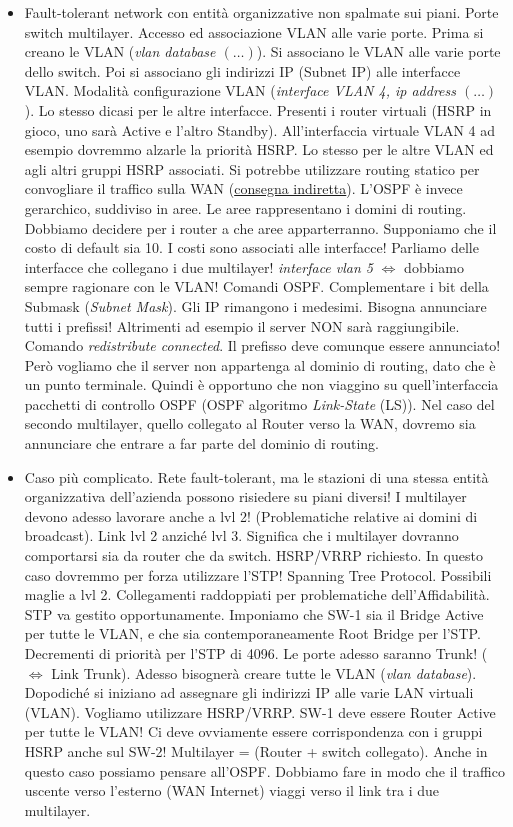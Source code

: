 \begin{itemize}

\item Fault-tolerant network con entità organizzative non spalmate sui piani. Porte switch multilayer. Accesso ed associazione VLAN alle varie porte. Prima si creano le VLAN (\textit{vlan database $(\dots)$}). Si associano le VLAN alle varie porte dello switch. Poi si associano gli indirizzi IP (Subnet IP) alle interfacce VLAN. Modalità configurazione VLAN (\textit{interface VLAN 4, ip address $(\dots)$}). Lo stesso dicasi per le altre interfacce. Presenti i router virtuali (HSRP in gioco, uno sarà Active e l'altro Standby). All'interfaccia virtuale VLAN 4 ad esempio dovremmo alzarle la priorità HSRP. Lo stesso per le altre VLAN ed agli altri gruppi HSRP associati. Si potrebbe utilizzare routing statico per convogliare il traffico sulla WAN (\underline{consegna indiretta}). L'OSPF è invece gerarchico, suddiviso in aree. Le aree rappresentano i domini di routing. Dobbiamo decidere per i router a che aree apparterranno. Supponiamo che il costo di default sia 10. I costi sono associati alle interfacce! Parliamo delle interfacce che collegano i due multilayer! \textit{interface vlan 5} $\iff$ dobbiamo sempre ragionare con le VLAN! Comandi OSPF. Complementare i bit della Submask (\textit{Subnet Mask}). Gli IP rimangono i medesimi. Bisogna annunciare tutti i prefissi! Altrimenti ad esempio il server NON sarà raggiungibile. Comando \textit{redistribute connected}. Il prefisso deve comunque essere annunciato! Però vogliamo che il server non appartenga al dominio di routing, dato che è un punto terminale. Quindi è opportuno che non viaggino su quell'interfaccia pacchetti di controllo OSPF (OSPF algoritmo \textit{Link-State} (LS)). Nel caso del secondo multilayer, quello collegato al Router verso la WAN, dovremo sia annunciare che entrare a far parte del dominio di routing.

\item Caso più complicato. Rete fault-tolerant, ma le stazioni di una stessa entità organizzativa dell'azienda possono risiedere su piani diversi! I multilayer devono adesso lavorare anche a lvl 2! (Problematiche relative ai domini di broadcast). Link lvl 2 anziché lvl 3. Significa che i multilayer dovranno comportarsi sia da router che da switch. HSRP/VRRP richiesto. In questo caso dovremmo per forza utilizzare l'STP! Spanning Tree Protocol. Possibili maglie a lvl 2. Collegamenti raddoppiati per problematiche dell'Affidabilità. STP va gestito opportunamente. Imponiamo che SW-1 sia il Bridge Active per tutte le VLAN, e che sia contemporaneamente Root Bridge per l'STP. Decrementi di priorità per l'STP di 4096. Le porte adesso saranno Trunk! ($\iff$ Link Trunk). Adesso bisognerà creare tutte le VLAN (\textit{vlan database}). Dopodiché si iniziano ad assegnare gli indirizzi IP alle varie LAN virtuali (VLAN). Vogliamo utilizzare HSRP/VRRP. SW-1 deve essere Router Active per tutte le VLAN! Ci deve ovviamente essere corrispondenza con i gruppi HSRP anche sul SW-2! Multilayer = (Router + switch collegato). Anche in questo caso possiamo pensare all'OSPF. Dobbiamo fare in modo che il traffico uscente verso l'esterno (WAN Internet) viaggi verso il link tra i due multilayer.


\end{itemize}

